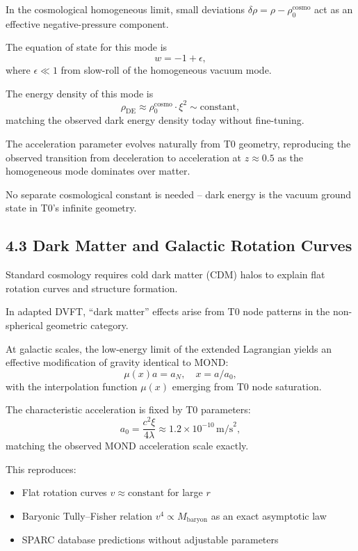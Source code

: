 \documentclass[12pt,a4paper]{article}
\begin{document}
	In the cosmological homogeneous limit, small deviations $\delta \rho = \rho - \rho_0^{\text{cosmo}}$ act as an effective negative-pressure component.
	
	The equation of state for this mode is
	\[
	w = -1 + \epsilon,
	\]
	where $\epsilon \ll 1$ from slow-roll of the homogeneous vacuum mode.
	
	The energy density of this mode is
	\[
	\rho_{\text{DE}} \approx \rho_0^{\text{cosmo}} \cdot \xi^2 \sim \text{constant},
	\]
	matching the observed dark energy density today without fine-tuning.
	
	The acceleration parameter evolves naturally from T0 geometry, reproducing the observed transition from deceleration to acceleration at $z \approx 0.5$ as the homogeneous mode dominates over matter.
	
	No separate cosmological constant is needed – dark energy is the vacuum ground state in T0's infinite geometry.
	
	\subsection{4.3 Dark Matter and Galactic Rotation Curves}
	
	Standard cosmology requires cold dark matter (CDM) halos to explain flat rotation curves and structure formation.
	
	In adapted DVFT, ``dark matter'' effects arise from T0 node patterns in the non-spherical geometric category.
	
	At galactic scales, the low-energy limit of the extended Lagrangian yields an effective modification of gravity identical to MOND:
	\[
	\mu(x) a = a_N, \quad x = a / a_0,
	\]
	with the interpolation function $\mu(x)$ emerging from T0 node saturation.
	
	The characteristic acceleration is fixed by T0 parameters:
	\[
	a_0 = \frac{c^2 \xi}{4 \lambda} \approx 1.2 \times 10^{-10} \, \text{m/s}^2,
	\]
	matching the observed MOND acceleration scale exactly.
	
	This reproduces:
	\begin{itemize}
		\item Flat rotation curves $v \approx \text{constant}$ for large $r$
		\item Baryonic Tully–Fisher relation $v^4 \propto M_{\text{baryon}}$ as an exact asymptotic law
		\item SPARC database predictions without adjustable parameters
	\end{itemize}
	
\end{document}
